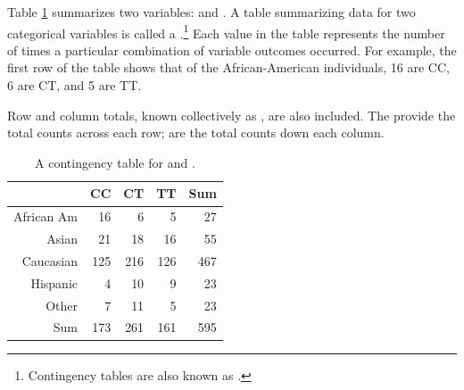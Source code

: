 Table \ref{famussContingencyTable} summarizes two variables:  and . A table summarizing data for two categorical variables is called a .\footnote{Contingency tables are also known as .} Each value in the table represents the number of times a particular combination of variable outcomes occurred. For example, the first row of the table shows that of the African-American individuals, 16 are CC, 6 are CT, and 5 are TT. 

Row and column totals, known collectively as , are also included. The  provide the total counts across each row;  are the total counts down each column.

\begin{table}[ht]
	\centering
	\begin{tabular}{rrrrr}
		\hline
		& CC & CT & TT & Sum \\ 
		\hline
		African Am & 16 & 6 & 5 & 27 \\ 
		Asian & 21 & 18 & 16 & 55 \\ 
		Caucasian & 125 & 216 & 126 & 467 \\ 
		Hispanic & 4 & 10 & 9 & 23 \\ 
		Other & 7 & 11 & 5 & 23 \\ 
		Sum & 173 & 261 & 161 & 595 \\ 
		\hline
	\end{tabular}
	\caption{A contingency table for  and .} 
	\label{famussContingencyTable}
\end{table}


